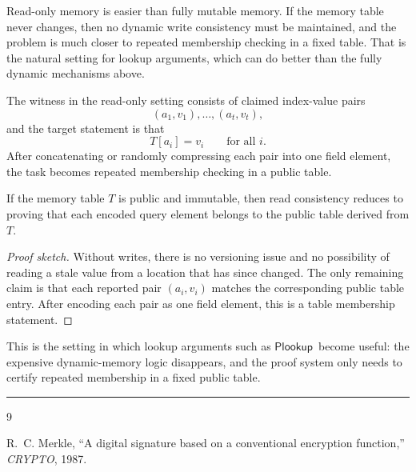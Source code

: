 \documentclass[11pt]{article}
\newcommand{\Plookup}{\ensuremath{\mathsf{Plookup}}}
\begin{document}
Read-only memory is easier than fully mutable memory.  If the memory table
never changes, then no dynamic write consistency must be maintained, and the
problem is much closer to repeated membership checking in a fixed table.  That
is the natural setting for lookup arguments, which can do better than the fully
dynamic mechanisms above.

The witness in the read-only setting consists of claimed index-value pairs
\[
  (a_1,v_1),\ldots,(a_t,v_t),
\]
and the target statement is that
\[
  T[a_i]=v_i
  \qquad\text{for all } i.
\]
After concatenating or randomly compressing each pair into one field element,
the task becomes repeated membership checking in a public table.

\begin{proposition}
If the memory table $T$ is public and immutable, then read consistency reduces
to proving that each encoded query element belongs to the public table derived
from $T$.
\end{proposition}

\begin{proof}[Proof sketch]
Without writes, there is no versioning issue and no possibility of reading a
stale value from a location that has since changed.  The only remaining claim
is that each reported pair $(a_i,v_i)$ matches the corresponding public table
entry.  After encoding each pair as one field element, this is a table
membership statement.
\end{proof}

This is the setting in which lookup arguments such as \Plookup\ become useful:
the expensive dynamic-memory logic disappears, and the proof system only needs
to certify repeated membership in a fixed public table.

\bigskip
\hrule
\bigskip

\begin{thebibliography}{9}

  R.~C. Merkle,
  ``A digital signature based on a conventional encryption function,''
  \emph{CRYPTO}, 1987.

\end{thebibliography}
\end{document}
